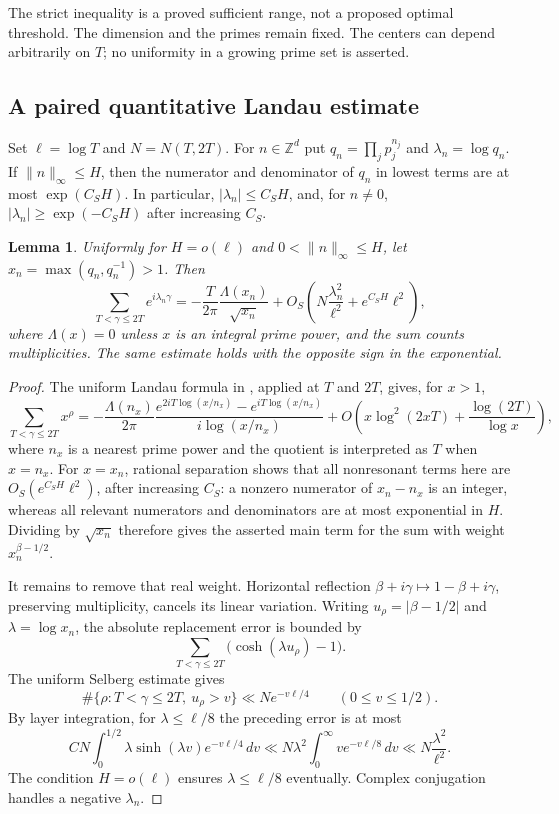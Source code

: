 \documentclass[11pt,letterpaper]{article}
\newtheorem{lemma}[theorem]{Lemma}
\theoremstyle{definition}
\theoremstyle{remark}
\newcommand{\1}{\mathbf 1}
\begin{document}
The strict inequality is a proved sufficient range, not a proposed
optimal threshold.  The dimension and the primes remain fixed.
The centers can depend arbitrarily on $T$; no uniformity in a growing
prime set is asserted.

\subsection{A paired quantitative Landau estimate}

Set $\ell=\log T$ and $N=N(T,2T)$.  For $n\in\mathbb Z^d$ put
$q_n=\prod_jp_j^{n_j}$ and $\lambda_n=\log q_n$.  If
$\|n\|_\infty\le H$, then the numerator and denominator of $q_n$
in lowest terms are at most $\exp(C_SH)$. In particular,
$|\lambda_n|\le C_SH$, and, for $n\ne0$,
$|\lambda_n|\ge\exp(-C_SH)$ after increasing $C_S$.

\begin{lemma}\label{p04:lem:paired-Landau}
Uniformly for $H=o(\ell)$ and $0<\|n\|_\infty\le H$, let
$x_n=\max(q_n,q_n^{-1})>1$. Then
\begin{equation}\label{p04:eq:paired-Landau}
 \sum_{T<\gamma\le2T}e^{i\lambda_n\gamma}
 =-\frac{T}{2\pi}\frac{\Lambda(x_n)}{\sqrt{x_n}}
 +O_S\left(N\frac{\lambda_n^2}{\ell^2}
               +e^{C_SH}\ell^2\right),
\end{equation}
where $\Lambda(x)=0$ unless $x$ is an integral prime power, and the
sum counts multiplicities.  The same estimate holds with the opposite
sign in the exponential.
\end{lemma}
\begin{proof}
The uniform Landau formula in \cite[Lemma~1]{FordZaharescu}, applied
at $T$ and $2T$, gives, for $x>1$,
\[
 \sum_{T<\gamma\le2T}x^\rho
 =-\frac{\Lambda(n_x)}{2\pi}
       \frac{e^{2iT\log(x/n_x)}-e^{iT\log(x/n_x)}}
            {i\log(x/n_x)}
 +O\left(x\log^2(2xT)+\frac{\log(2T)}{\log x}\right),
\]
where $n_x$ is a nearest prime power and the quotient is interpreted
as $T$ when $x=n_x$. For $x=x_n$, rational separation shows that
all nonresonant terms here are $O_S(e^{C_SH}\ell^2)$, after increasing
$C_S$: a nonzero numerator of $x_n-n_x$ is an integer, whereas all
relevant numerators and denominators are at most exponential in $H$.
Dividing by $\sqrt{x_n}$ therefore gives the asserted main term for
the sum with weight $x_n^{\beta-1/2}$.

It remains to remove that real weight.  Horizontal reflection
$\beta+i\gamma\mapsto1-\beta+i\gamma$, preserving multiplicity,
cancels its linear variation.  Writing $u_\rho=|\beta-1/2|$ and
$\lambda=\log x_n$, the absolute replacement error is bounded by
\[
 \sum_{T<\gamma\le2T}\bigl(\cosh(\lambda u_\rho)-1\bigr).
\]
The uniform Selberg estimate gives
\[
 \#\{\rho:T<\gamma\le2T,\ u_\rho>v\}
       \ll N e^{-v\ell/4}\qquad(0\le v\le1/2).
\]
By layer integration, for $\lambda\le\ell/8$ the preceding error is
at most
\[
 C N\int_0^{1/2}\lambda\sinh(\lambda v)e^{-v\ell/4}\,dv
 \ll N\lambda^2\int_0^\infty v e^{-v\ell/8}\,dv
 \ll N\frac{\lambda^2}{\ell^2}.
\]
The condition $H=o(\ell)$ ensures $\lambda\le\ell/8$ eventually.
Complex conjugation handles a negative $\lambda_n$.
\end{proof}
\end{document}
